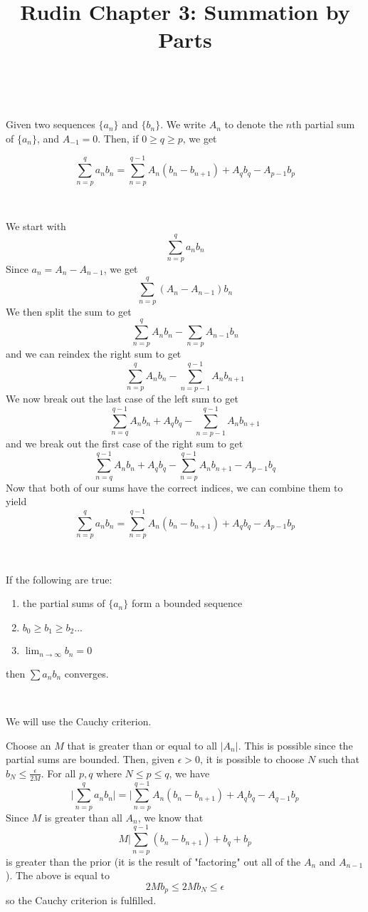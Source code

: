 \documentclass{article}
\title{Rudin Chapter 3: Summation by Parts}
\begin{document}
\maketitle

\begin{theorem}
\

Given two sequences $\{a_n\}$ and $\{b_n\}$. We write $A_n$ to denote the $n$th partial sum of $\{a_n\}$, and $A_{-1} = 0$. Then, if $0 \geq q \geq p$, we get 

$$\sum_{n = p}^q a_n b_n = \sum_{n=p}^{q-1} A_n(b_n - b_{n+1}) + A_qb_q - A_{p-1}b_p$$
\end{theorem}

\begin{customproof}
\

We start with $$\sum_{n=p}^q a_n b_n$$Since $a_n = A_n - A_{n-1}$, we get $$\sum_{n=p}^q (A_n - A_{n-1})b_n$$We then split the sum to get $$\sum_{n=p}^q A_nb_n - \sum_{n=p} A_{n-1}b_n$$and we can reindex the right sum to get $$\sum_{n=p}^q A_nb_n - \sum_{n=p-1}^{q-1} A_nb_{n+1}$$We now break out the last case of the left sum to get $$\sum_{n=q}^{q-1} A_nb_n + A_qb_q - \sum_{n=p-1}^{q-1} A_nb_{n+1}$$and we break out the first case of the right sum to get $$\sum_{n=q}^{q-1} A_nb_n + A_qb_q - \sum_{n=p}^{q-1} A_nb_{n+1} -A_{p-1}b_q$$Now that both of our sums have the correct indices, we can combine them to yield $$\sum_{n = p}^q a_n b_n = \sum_{n=p}^{q-1} A_n(b_n - b_{n+1}) + A_qb_q - A_{p-1}b_p$$
\end{customproof}

\begin{theorem}
\

If the following are true:

\begin{enumerate}
    \item the partial sums of $\{a_n\}$ form a bounded sequence
    \item $b_0 \geq b_1 \geq b_2 ... $
    \item $\lim_{n \to \infty} b_n = 0$
\end{enumerate}
then $\sum a_n b_n$ converges.
\end{theorem}

\begin{customproof}
\

We will use the Cauchy criterion. 

Choose an $M$ that is greater than or equal to all $\vert A_n \vert$. This is possible since the partial sums are bounded. Then, given $\epsilon > 0$, it is possible to choose $N$ such that $b_N \leq \frac{\epsilon}{2M}$. For all $p, q$ where $N \leq p \leq q$, we have $$\vert \sum_{n=p}^q a_n b_n \vert = \vert \sum_{n=p}^{q-1} A_n (b_n - b_{n+1}) + A_q b_q - A_{q-1} b_p$$Since $M$ is greater than all $A_n$, we know that $$M \vert \sum_{n=p}^{q-1} (b_n - b_{n+1}) + b_q + b_p$$is greater than the prior (it is the result of "factoring" out all of the $A_n$ and $A_{n-1}$). The above is equal to $$2Mb_p \leq 2Mb_N \leq \epsilon$$so the Cauchy criterion is fulfilled. 
\end{customproof}
\end{document}
